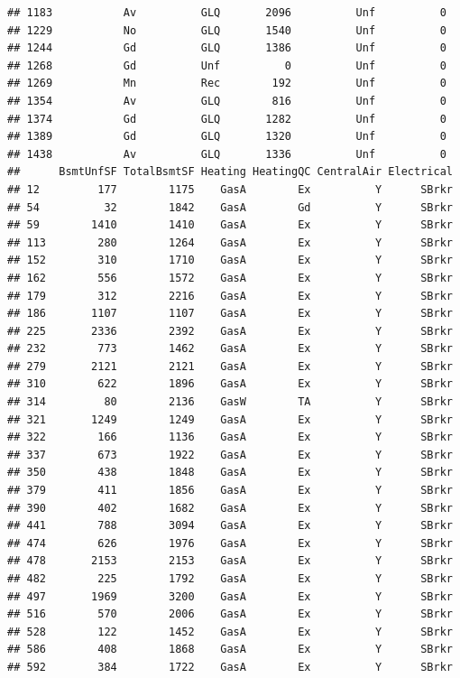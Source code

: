 \documentclass[]{article}
\begin{document}
\begin{verbatim}
## 1183           Av          GLQ       2096          Unf          0
## 1229           No          GLQ       1540          Unf          0
## 1244           Gd          GLQ       1386          Unf          0
## 1268           Gd          Unf          0          Unf          0
## 1269           Mn          Rec        192          Unf          0
## 1354           Av          GLQ        816          Unf          0
## 1374           Gd          GLQ       1282          Unf          0
## 1389           Gd          GLQ       1320          Unf          0
## 1438           Av          GLQ       1336          Unf          0
##      BsmtUnfSF TotalBsmtSF Heating HeatingQC CentralAir Electrical
## 12         177        1175    GasA        Ex          Y      SBrkr
## 54          32        1842    GasA        Gd          Y      SBrkr
## 59        1410        1410    GasA        Ex          Y      SBrkr
## 113        280        1264    GasA        Ex          Y      SBrkr
## 152        310        1710    GasA        Ex          Y      SBrkr
## 162        556        1572    GasA        Ex          Y      SBrkr
## 179        312        2216    GasA        Ex          Y      SBrkr
## 186       1107        1107    GasA        Ex          Y      SBrkr
## 225       2336        2392    GasA        Ex          Y      SBrkr
## 232        773        1462    GasA        Ex          Y      SBrkr
## 279       2121        2121    GasA        Ex          Y      SBrkr
## 310        622        1896    GasA        Ex          Y      SBrkr
## 314         80        2136    GasW        TA          Y      SBrkr
## 321       1249        1249    GasA        Ex          Y      SBrkr
## 322        166        1136    GasA        Ex          Y      SBrkr
## 337        673        1922    GasA        Ex          Y      SBrkr
## 350        438        1848    GasA        Ex          Y      SBrkr
## 379        411        1856    GasA        Ex          Y      SBrkr
## 390        402        1682    GasA        Ex          Y      SBrkr
## 441        788        3094    GasA        Ex          Y      SBrkr
## 474        626        1976    GasA        Ex          Y      SBrkr
## 478       2153        2153    GasA        Ex          Y      SBrkr
## 482        225        1792    GasA        Ex          Y      SBrkr
## 497       1969        3200    GasA        Ex          Y      SBrkr
## 516        570        2006    GasA        Ex          Y      SBrkr
## 528        122        1452    GasA        Ex          Y      SBrkr
## 586        408        1868    GasA        Ex          Y      SBrkr
## 592        384        1722    GasA        Ex          Y      SBrkr

\end{verbatim}
\end{document}
